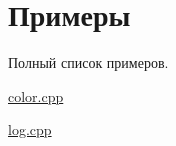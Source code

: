 \section{Примеры}
Полный список примеров.\begin{DoxyCompactItemize}
\item 
\hyperlink{color_8cpp-example}{color.\+cpp}
\item 
\hyperlink{log_8cpp-example}{log.\+cpp}
\end{DoxyCompactItemize}
